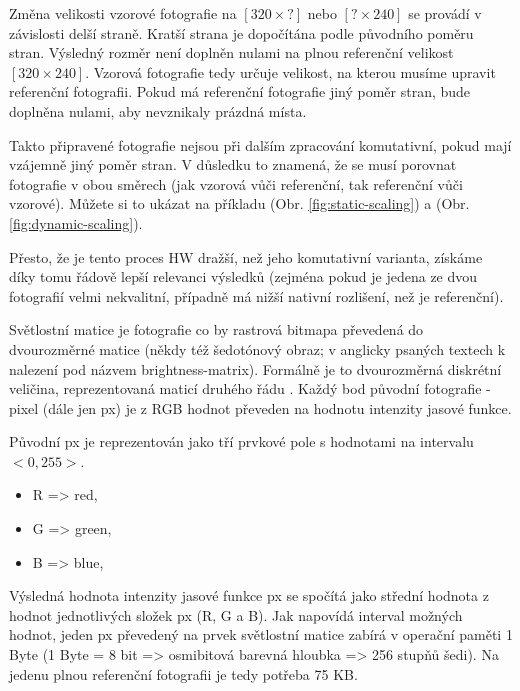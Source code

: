 Změna velikosti vzorové fotografie na $ [320 × ?] $ nebo $ [? × 240] $ se provádí v závislosti delší straně. Kratší strana je dopočítána podle původního poměru stran. Výsledný rozměr není doplněn nulami na plnou referenční velikost $ [320 × 240] $. Vzorová fotografie tedy určuje velikost, na kterou musíme upravit referenční fotografii. Pokud má referenční fotografie jiný poměr stran, bude doplněna nulami, aby nevznikaly prázdná místa.

Takto připravené fotografie nejsou při dalším zpracování komutativní, pokud mají vzájemně jiný poměr stran. V důsledku to znamená, že se musí porovnat fotografie v obou směrech (jak vzorová vůči referenční, tak referenční vůči vzorové). Můžete si to ukázat na příkladu (Obr. \ref{fig:static-scaling}) a (Obr. \ref{fig:dynamic-scaling}).




Přesto, že je tento proces HW dražší, než jeho komutativní varianta, získáme díky tomu řádově lepší relevanci výsledků (zejména pokud je jedena ze dvou fotografií velmi nekvalitní, případně má nižší nativní rozlišení, než je referenční).

Světlostní matice je fotografie co by rastrová bitmapa převedená do dvourozměrné matice (někdy též šedotónový obraz; v anglicky psaných textech k nalezení pod názvem brightness-matrix). Formálně je to dvourozměrná diskrétní veličina, reprezentovaná maticí druhého řádu \cite{brightness-matrix}. Každý bod původní fotografie - pixel \cite{pixel} (dále jen px) je z RGB \cite{rgb} hodnot převeden na hodnotu intenzity jasové funkce.

Původní px je reprezentován jako tří prvkové pole s hodnotami na intervalu $ <0,255> $.
\begin{itemize}
	\setlength{\parskip}{0pt}
	\setlength{\itemsep}{0pt}
	\item R => red,
	\item G => green,
	\item B => blue,
\end{itemize}

Výsledná hodnota intenzity jasové funkce px se spočítá jako střední hodnota z hodnot jednotlivých složek px (R, G a B). Jak napovídá interval možných hodnot, jeden px převedený na prvek světlostní matice zabírá v operační paměti 1 Byte (1 Byte = 8 bit => osmibitová barevná hloubka => 256 stupňů šedi). Na jedenu plnou referenční fotografii je tedy potřeba 75 KB.

